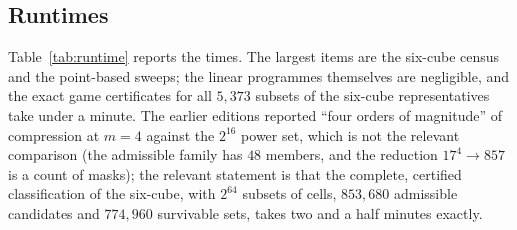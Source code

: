 \subsection{Runtimes}
\begin{table}[t]
\centering\small
\caption{Wall-clock times of the exact pipeline (single core, Python with exact fractions and NumPy for the bit-mask census). ``Classification'' includes the maximal cliques, the orbit decomposition, all linear programmes, the $5{,}373$ certified subset thresholds of the six-cube and the census; ``point-based'' the alpha-sets for $k\le4$ at $m=4,5$, $k\le3$ at $m=6$, and the obstruction analysis; ``float'' the simulations of Section~\ref{sec:float}.}
\label{tab:runtime}

\end{table}
Table~\ref{tab:runtime} reports the times. The largest items are the six-cube census and the point-based sweeps; the linear programmes themselves are negligible, and the exact game certificates for all $5{,}373$ subsets of the six-cube representatives take under a minute. The earlier editions reported ``four orders of magnitude'' of compression at $m=4$ against the $2^{16}$ power set, which is not the relevant comparison (the admissible family has $48$ members, and the reduction $17^4\to857$ is a count of masks); the relevant statement is that the complete, certified classification of the six-cube, with $2^{64}$ subsets of cells, $853{,}680$ admissible candidates and $774{,}960$ survivable sets, takes two and a half minutes exactly.
